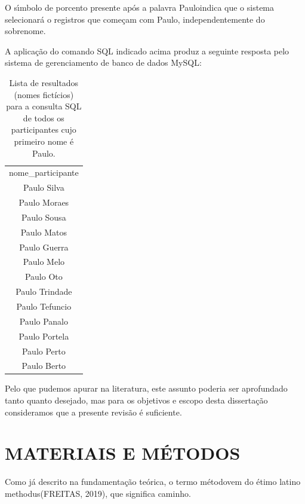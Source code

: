 \documentclass[
12pt,		%
openright,	%
twoside,  %
a4paper,			%
chapter=TITLE,		%
english,			%
french,				%
spanish,			%
brazil				%
]{USPSC-classe/USPSC}
\begin{document}
O s\'{\i}mbolo de porcento presente ap\'os a palavra \textquotedbl Paulo\textquotedbl  indica que o sistema selecionar\'a o registros que come\c{c}am com \textquotedbl Paulo\textquotedbl , independentemente do sobrenome.




A aplica\c{c}\~ao do comando SQL indicado acima produz a seguinte resposta pelo sistema de gerenciamento de banco de dados MySQL:








\begin{table}[htb]
\tiny
\caption{\label{fe3cd6334e1b9072eda70730e1734e26869d9c57}Lista de resultados (nomes fict\'{i}cios) para a consulta SQL de todos os participantes cujo primeiro nome \'e Paulo.}

\centering
\begin{tabular}{|c|}
\hline
nome\_participante        \\
Paulo Silva              \\
Paulo Moraes \\
Paulo Sousa \\
Paulo Matos \\
Paulo Guerra \\
Paulo Melo \\
Paulo Oto \\
Paulo Trindade \\
Paulo Tefuncio \\
Paulo Panalo \\
Paulo Portela \\
Paulo Perto \\
Paulo Berto \\
\hline
\end{tabular}
\end{table}


Pelo que pudemos apurar na literatura, este assunto poderia ser aprofundado tanto quanto desejado, mas para os objetivos e escopo desta disserta\c{c}\~ao consideramos que a presente revis\~ao \'e suficiente.




\chapter[MATERIAIS E M\'ETODOS]{MATERIAIS E M\'ETODOS}\label{MATERIAIS E M\'ETODOS}
Como j\'a descrito na fundamenta\c{c}\~ao te\'orica, o termo \textquotedbl m\'etodo\textquotedbl  vem do \'etimo latino \textquotedbl methodus\textquotedbl   (FREITAS, 2019), que significa \textquotedbl caminho\textquotedbl .
\end{document}
